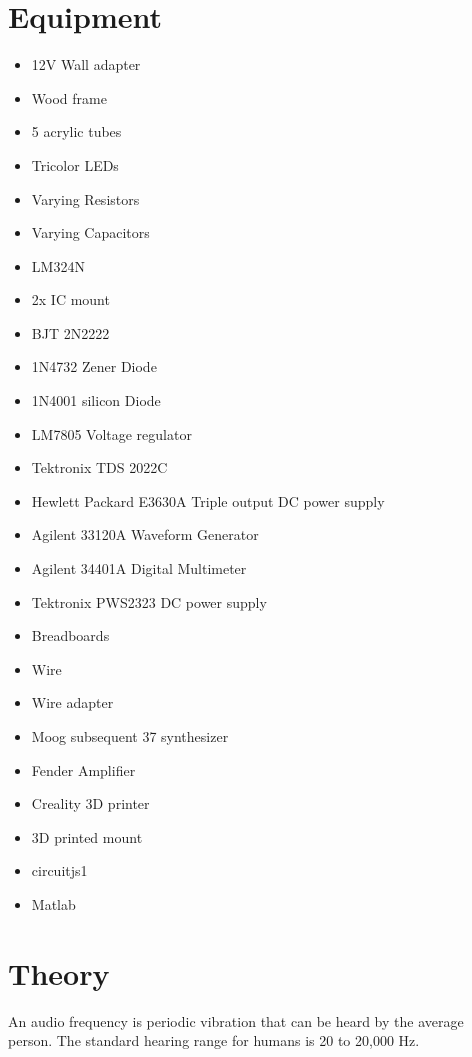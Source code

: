 \documentclass[12pt,a4paper]{article}
\begin{document}
    \section*{Equipment}
        \begin{itemize}
            \item 12V Wall adapter
            \item Wood frame
            \item 5 acrylic tubes
            \item Tricolor LEDs
            \item Varying Resistors
            \item Varying Capacitors
            \item LM324N
            \item 2x IC mount
            \item BJT 2N2222
            \item 1N4732 Zener Diode
            \item 1N4001 silicon Diode
            \item LM7805 Voltage regulator
            \item Tektronix TDS 2022C
            \item Hewlett Packard E3630A Triple output DC power supply
            \item Agilent 33120A Waveform Generator
            \item Agilent 34401A Digital Multimeter
            \item Tektronix PWS2323 DC power supply
            \item Breadboards
            \item Wire
            \item Wire adapter
            \item Moog subsequent 37 synthesizer
            \item Fender Amplifier
            \item Creality 3D printer
            \item 3D printed mount
            \item circuitjs1
            \item Matlab
        \end{itemize}
    \newpage

    \section*{Theory}
    An audio frequency is periodic vibration that can be heard by the average person. The standard hearing range for humans is 20 to 20,000 Hz.
\end{document}
